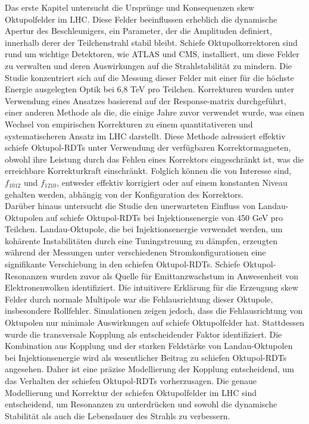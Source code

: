 {%
Das erste Kapitel untersucht die Ursprünge und Konsequenzen skew Oktupolfelder im LHC. Diese
Felder beeinflussen erheblich die dynamische Apertur des Beschleunigers, ein Parameter, der die
Amplituden definiert, innerhalb derer der Teilchenstrahl stabil bleibt. Schiefe Oktupolkorrektoren
sind rund um wichtige Detektoren, wie ATLAS und CMS, installiert, um diese Felder zu verwalten und
deren Auswirkungen auf die Strahlstabilität zu mindern. Die Studie konzentriert sich auf die Messung
dieser Felder mit einer für die höchste Energie ausgelegten Optik bei 6,8 TeV pro Teilchen.
Korrekturen wurden unter Verwendung eines Ansatzes basierend auf der Response-matrix durchgeführt,
einer anderen Methode als die, die einige Jahre zuvor verwendet wurde, was einen Wechsel von
empirischen Korrekturen zu einem quantitativeren und systematischeren Ansatz im LHC darstellt. 
Diese Methode adressiert effektiv schiefe Oktupol-RDTs unter Verwendung der verfügbaren
Korrektormagneten, obwohl ihre Leistung durch das Fehlen eines Korrektors eingeschränkt ist, was die
erreichbare Korrekturkraft einschränkt. Folglich können die von Interesse sind, $f_{1012}$ und
$f_{1210}$, entweder effektiv korrigiert oder auf einem konstanten Niveau gehalten werden, abhängig
von der Konfiguration des Korrektors.
\\
\indent
Darüber hinaus untersucht die Studie den unerwarteten Einfluss von Landau-Oktupolen auf
schiefe Oktupol-RDTs bei Injektionsenergie von 450 GeV pro Teilchen. Landau-Oktupole, die bei
Injektionsenergie verwendet werden, um kohärente Instabilitäten durch eine Tuningstreuung zu
dämpfen, erzeugten während der Messungen unter verschiedenen Stromkonfigurationen eine signifikante
Verschiebung in den schiefen Oktupol-RDTs. Schiefe Oktupol-Resonanzen wurden zuvor als Quelle für
Emittanzwachstum in Anwesenheit von Elektronenwolken identifiziert. Die intuitivere Erklärung für
die Erzeugung skew Felder durch normale Multipole war die Fehlausrichtung dieser Oktupole,
insbesondere Rollfehler. Simulationen zeigen jedoch, dass die Fehlausrichtung von Oktupolen nur
minimale Auswirkungen auf schiefe Oktupolfelder hat. Stattdessen wurde die transversale Kopplung als
entscheidender Faktor identifiziert. Die Kombination aus Kopplung und der starken Feldstärke
von Landau-Oktupolen bei Injektionsenergie wird als wesentlicher Beitrag zu schiefen Oktupol-RDTs
angesehen. Daher ist eine präzise Modellierung der Kopplung entscheidend, um das Verhalten der
schiefen Oktupol-RDTs vorherzusagen. Die genaue Modellierung und Korrektur der schiefen
Oktupolfelder im LHC sind entscheidend, um Resonanzen zu unterdrücken und sowohl die dynamische
Stabilität als auch die Lebensdauer des Strahls zu verbessern.

}
